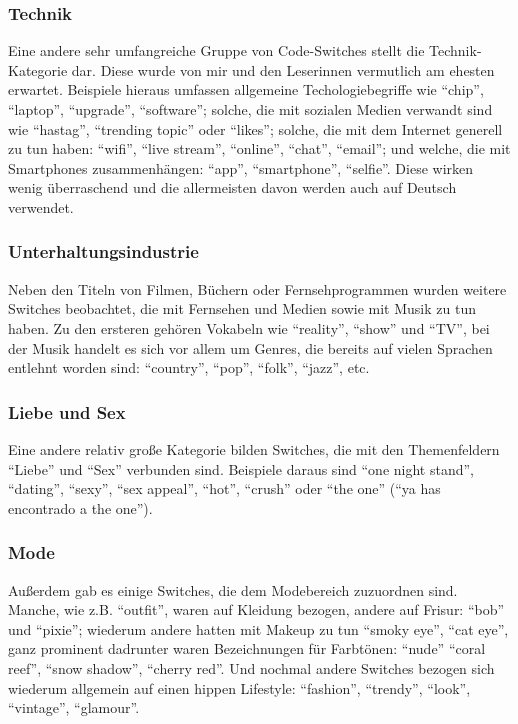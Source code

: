 \subsubsection{Technik}
Eine andere sehr umfangreiche Gruppe von Code-Switches stellt die Technik-Kategorie dar.
Diese wurde von mir und den Leserinnen vermutlich am ehesten erwartet.
Beispiele hieraus umfassen allgemeine Techologiebegriffe wie ``chip'', ``laptop'', ``upgrade'', ``software'';
solche, die mit sozialen Medien verwandt sind wie ``hastag'', ``trending topic'' oder ``likes'';
solche, die mit dem Internet generell zu tun haben: ``wifi'', ``live stream'', ``online'', ``chat'', ``email'';
und welche, die mit Smartphones zusammenhängen: ``app'', ``smartphone'', ``selfie''.
Diese wirken wenig überraschend und die allermeisten davon werden auch auf Deutsch verwendet.


\subsubsection{Unterhaltungsindustrie}
Neben den Titeln von Filmen, Büchern oder Fernsehprogrammen wurden weitere Switches beobachtet, die mit Fernsehen und Medien sowie mit Musik zu tun haben.
Zu den ersteren gehören Vokabeln wie ``reality'', ``show'' und ``TV'',
bei der Musik handelt es sich vor allem um Genres, die bereits auf vielen Sprachen entlehnt worden sind: ``country'', ``pop'', ``folk'', ``jazz'', etc.

\subsubsection{Liebe und Sex}
Eine andere relativ große Kategorie bilden Switches, die mit den Themenfeldern ``Liebe'' und ``Sex'' verbunden sind.
Beispiele daraus sind ``one night stand'', ``dating'', ``sexy'', ``sex appeal'', ``hot'', ``crush'' oder ``the one'' (``ya has encontrado a the one'').

\subsubsection{Mode}
Außerdem gab es einige Switches, die dem Modebereich zuzuordnen sind.
Manche, wie z.B. ``outfit'', waren auf Kleidung bezogen, andere auf Frisur: ``bob'' und ``pixie'';
wiederum andere hatten mit Makeup zu tun ``smoky eye'', ``cat eye'', ganz prominent dadrunter waren Bezeichnungen für Farbtönen: ``nude'' ``coral reef'', ``snow shadow'', ``cherry red''.
Und nochmal andere Switches bezogen sich wiederum allgemein auf einen hippen Lifestyle:
``fashion'', ``trendy'', ``look'', ``vintage'', ``glamour''.

